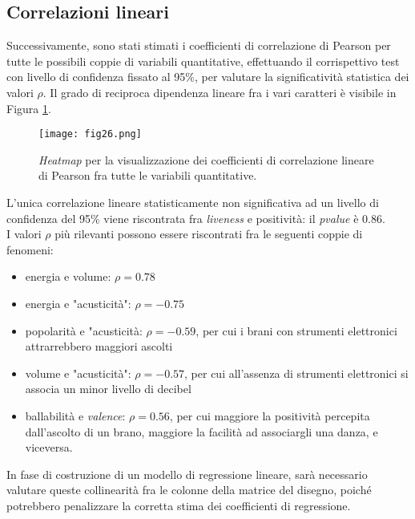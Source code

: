 \documentclass[fleqn,10pt]{SelfArx} %
\begin{document}
\subsection{Correlazioni lineari}\label{corr}
Successivamente, sono stati stimati i coefficienti di correlazione di Pearson per tutte le possibili coppie di variabili quantitative, effettuando il corrispettivo test con livello di confidenza fissato al 95\%, per valutare la significatività statistica dei valori $\rho$. Il grado di reciproca dipendenza lineare fra i vari caratteri è visibile in Figura \ref{fig:fig26}.
\begin{figure}[H]
    \centering
    \texttt{[image: fig26.png]}
    \label{fig:fig26}
    \caption{\textit{Heatmap} per la visualizzazione dei coefficienti di correlazione lineare di Pearson fra tutte le variabili quantitative.}
\end{figure}
L'unica correlazione lineare statisticamente non significativa ad un livello di confidenza del 95\% viene riscontrata fra \textit{liveness} e positività: il \textit{pvalue} è 0.86.\\
I valori $\rho$ più rilevanti possono essere riscontrati fra le seguenti coppie di fenomeni:
\begin{itemize}
    \item energia e volume: $\rho=0.78$ 
    \item energia e "acusticità": $\rho=-0.75$
    \item popolarità e "acusticità: $\rho=-0.59$, per cui i brani con strumenti elettronici attrarrebbero maggiori ascolti
    \item volume e "acusticità": $\rho=-0.57$, per cui all'assenza di strumenti elettronici si associa un minor livello di decibel
    \item ballabilità e \textit{valence}: $\rho=0.56$, per cui maggiore la positività percepita dall'ascolto di un brano, maggiore la facilità ad associargli una danza, e viceversa. 
\end{itemize}
In fase di costruzione di un modello di regressione lineare, sarà necessario valutare queste collinearità fra le colonne della matrice del disegno, poiché potrebbero penalizzare la corretta stima dei coefficienti di regressione.
\end{document}

